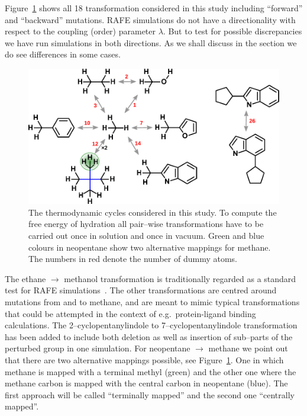 \documentclass[journal=jctcce,manuscript=article]{achemso}
\begin{document}
Figure~\ref{fig:cycles} shows all 18 transformation considered in this
study including ``forward'' and ``backward'' mutations.  RAFE
simulations do not have a directionality with respect to the coupling (order) 
parameter $\lambda$.
But to test for possible discrepancies we have run 
simulations in both directions.  As we shall discuss in the 
 section we do see differences in some cases.
\begin{figure}[ht]
  \includegraphics[scale=1.0]{figures/cycles.pdf}
  \caption{The thermodynamic cycles considered in this study.  To
    compute the free energy of hydration all pair--wise
    transformations have to be carried out once in solution and once
    in vacuum.  Green and blue colours in neopentane show two
    alternative mappings for methane.  The numbers in red denote the
    number of dummy atoms.}
  \label{fig:cycles}
\end{figure}

The ethane $\rightarrow$ methanol transformation is traditionally
regarded as a standard test for RAFE
simulations~\cite{doi:10.1063/1.449208, doi:10.1021/jp981629f}.   The
other transformations are centred around mutations from and to
methane, and are meant to mimic typical transformations that could be attempted
in the context of e.g.\ protein-ligand binding calculations. The 
2--cyclopentanylindole to 7--cyclopentanylindole
transformation has been added to include both deletion as well as
insertion of sub--parts of the perturbed group in one simulation.  For
neopentane $\rightarrow$ methane we point out that there are two
alternative mappings possible, see Figure~\ref{fig:cycles}.  One in
which methane is mapped with a terminal methyl (green) and the other
one where the methane carbon is mapped with the central carbon in
neopentane (blue).  The first approach will be called ``terminally mapped'' and 
the second one ``centrally mapped''.
\end{document}
